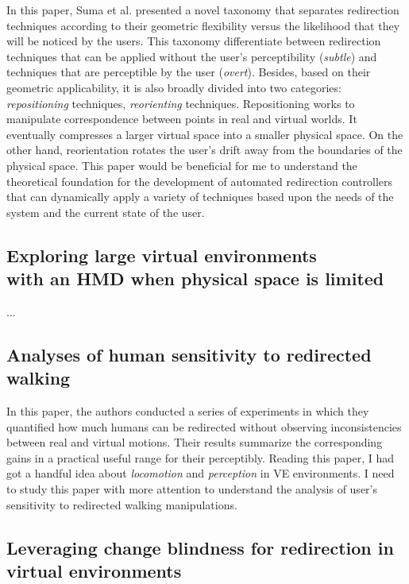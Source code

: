 \documentclass[12pt]{article}
\begin{document}
In this paper, Suma et al. presented a novel taxonomy that separates redirection techniques according to their geometric flexibility versus the likelihood that they will be noticed by the users. This taxonomy differentiate between redirection techniques that can be applied without the user's perceptibility (\emph{subtle}) and techniques that are perceptible by the user (\emph{overt}). Besides, based on their geometric applicability, it is also broadly divided into two categories: \emph{repositioning} techniques, \emph{reorienting} techniques. Repositioning works to manipulate correspondence between points in real and virtual worlds. It eventually compresses a larger virtual space into a smaller physical space. On the other hand, reorientation rotates the user's drift away from the boundaries of the physical space. This paper would be beneficial for me to understand the theoretical foundation for the development of automated redirection controllers that can dynamically apply a variety of techniques based upon the needs of the system and the current state of the user.

\subsection[Exploring large virtual environments with an HMD when physical space is limited]{Exploring large virtual environments\\ with an HMD when physical space is limited}
\textbf{\cite{williams2007exploring}}

...

\subsection{Analyses of human sensitivity to redirected walking}
\textbf{\cite{steinicke2008analyses}}

In this paper, the authors conducted a series of experiments in which they quantified how much humans can be redirected without observing inconsistencies between real and virtual motions. Their results summarize the corresponding gains in a practical useful range for their perceptibly. Reading this paper, I had got a handful idea about \emph{locomotion} and \emph{perception} in VE environments. I need to study this paper with more attention to understand the analysis of user's sensitivity to redirected walking manipulations.

\subsection{Leveraging change blindness for redirection in virtual environments}
\textbf{\cite{suma2011leveraging}}
\end{document}
